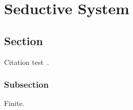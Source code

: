 \chapter{Seductive System}\label{chapter:predicate}

\section{Section}
Citation test~\parencite{Paulson1989}.

\subsection{Subsection}

Finite.